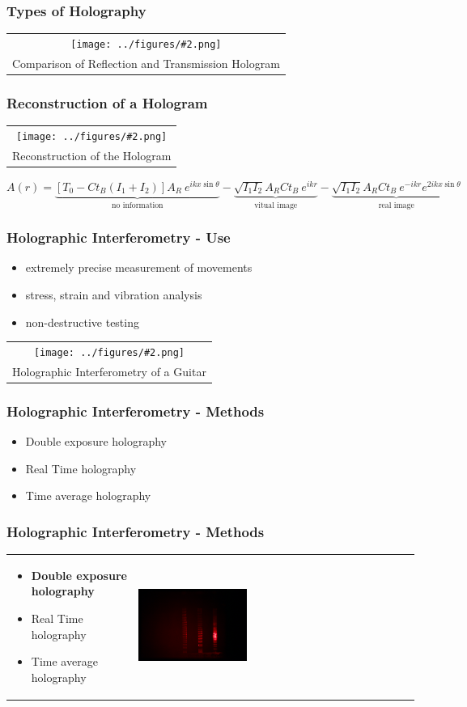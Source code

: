 \documentclass{beamer}
\newcommand{\gra}[3][]{
	\begin{table}
	\centering
	\begin{tabular}[width=\textwidth]{c}
		\texttt{[image: ../figures/\#2.png]}\\
		\small #3
	\end{tabular}
	\end{table}
}
\begin{document}
\begin{frame}
	\frametitle{Types of Holography}
\gra[0.5]{Reflex_Transmissions_Hologram}{Comparison of Reflection and Transmission Hologram  \footfullcite{staats}}
\end{frame}
\begin{frame}
	\frametitle{Reconstruction of a Hologram}
	
\gra[0.5]{Reconstruction1}{Reconstruction of the Hologram \footfullcite{staats}}
	$A(r)=\underbrace{[T_0-Ct_B(I_1+I_2)]A_R\ e^{ikx \sin\theta}}_{\mbox{no information}} - \underbrace{\sqrt{I_1I_2}A_RCt_B\ e^{ikr}}_{\mbox{vitual image}} - \underbrace{\sqrt{I_1I_2}A_RCt_B\ e^{-ikr}e^{2ikx \sin\theta}}_{\mbox{real image}}$
	
\end{frame}
\begin{frame}
	\frametitle{Holographic Interferometry - Use}
	\begin{itemize}
		\item extremely precise measurement of movements
		\item stress, strain and vibration analysis
		\item non-destructive testing
	\end{itemize}
	\gra[0.34]{HI}{Holographic Interferometry of a Guitar \footnotemark}
\end{frame}
\begin{frame}
	\frametitle{Holographic Interferometry - Methods}
	\begin{itemize}
		\item Double exposure holography
		\item Real Time holography
		\item Time average holography
	\end{itemize}
\end{frame}
\begin{frame}
	\frametitle{Holographic Interferometry - Methods}

			\begin{table}
				\centering
				\begin{tabular}[width=\textwidth]{m{6cm}m{4cm}}
			\begin{itemize}
				\item \textbf{Double exposure holography}
				\item Real Time holography
				\item Time average holography
			\end{itemize}
					&
				\includegraphics[width=0.4\textwidth]{../figures/staebe4.png}
				\end{tabular}
			\end{table}

	
\end{frame}
\end{document}
